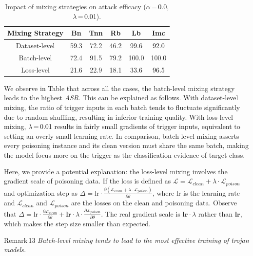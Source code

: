 \documentclass[compsoc,conference,a4paper,10pt,times]{IEEEtran}
\newcommand{\bn}{{\sc Bn}\xspace}
\newcommand{\tnn}{{\sc Tnn}\xspace}
\newcommand{\lb}{{\sc Lb}\xspace}
\newcommand{\rfb}{{\sc Rb}\xspace}
\newcommand{\imc}{{\sc Imc}\xspace}
\newcommand{\asr}{{\em \small ASR}\xspace}
\begin{document}
\begin{table}[!ht]{\footnotesize
\centering
\renewcommand{\arraystretch}{1.2}
\begin{tabular}{c|c|c|c|c|c}
{Mixing Strategy} & \bn & \tnn & \rfb & \lb & \imc \\
\hline
\hline
Dataset-level & 59.3 & 72.2 & 46.2 & 99.6 & 92.0 \\
Batch-level & \cellcolor{Red}72.4 & \cellcolor{Red}91.5 & \cellcolor{Red}79.2 & \cellcolor{Red}100.0 & \cellcolor{Red}100.0 \\
Loss-level & 21.6 & 22.9 & 18.1 & 33.6 & 96.5  \\
\end{tabular}
\caption{Impact of mixing strategies on attack efficacy ($\alpha$\,=\,0.0, $\lambda$\,=\,0.01).\label{tab:mix}}}
\end{table}

We observe in Table that across all the cases, the batch-level mixing strategy leads to the highest \asr. This can be explained as follows. With dataset-level mixing, the ratio of trigger inputs in each batch tends to fluctuate significantly due to random shuffling, resulting in inferior training quality. With loss-level mixing, 
$\lambda$\,=\,0.01 results in fairly small gradients of trigger inputs, equivalent to setting an overly small learning rate. In comparison, batch-level mixing asserts every poisoning instance and its clean version must share the same batch, making the model focus more on the trigger as the classification evidence of target class.

Here, we provide a potential explanation: the loss-level mixing involves the gradient scale of poisoning data. If the loss is defined as $\mathcal{L}=\mathcal{L}_{clean}+\lambda \cdot \mathcal{L}_{poison}$ and optimization step as $\Delta=\text{lr}\cdot \frac{\partial ( \mathcal{L}_{clean}+\lambda\cdot\mathcal{L}_{poison})}{\partial \theta}$, where $\text{lr}$ is the learning rate and $\mathcal{L}_{clean}$ and $\mathcal{L}_{poison}$ are the losses on the clean and poisoning data. Observe that $\Delta=\text{lr}\cdot \frac{\partial  \mathcal{L}_{clean}}{\partial \theta} + \textbf{lr}\cdot \lambda \cdot \frac{\partial  \mathcal{L}_{poison}}{\partial \theta}$. The real gradient scale is $\textbf{lr}\cdot \lambda$ rather than $\textbf{lr}$, which makes the step size smaller than expected. 
\begin{mtbox}{\small Remark\,13}
    {\em \small Batch-level mixing tends to lead to the most effective training of trojan models.}
\end{mtbox}
\end{document}

